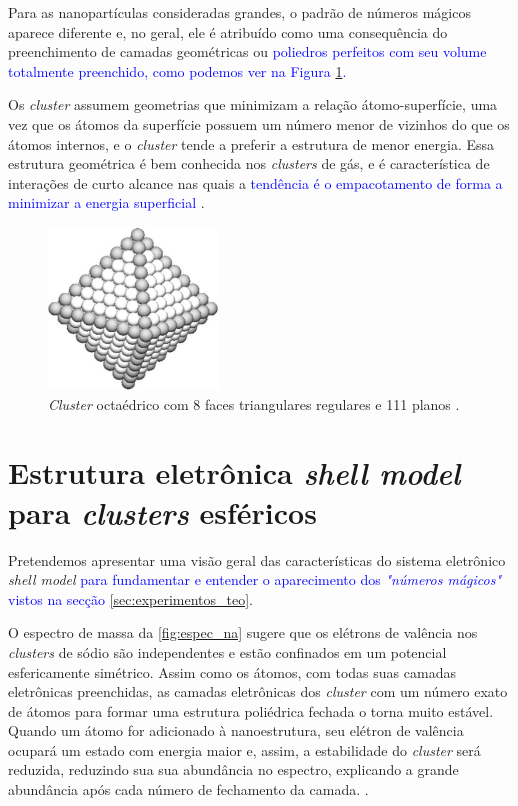 Para as nanopartículas consideradas grandes, o padrão de números mágicos aparece diferente e, no geral, ele é atribuído como uma consequência do preenchimento de camadas geométricas ou \textcolor{blue}{poliedros perfeitos com seu volume totalmente preenchido, como podemos ver na Figura \ref{fig:octaedro}.}

Os \textit{cluster} assumem geometrias que minimizam a relação átomo-superfície, uma vez que os átomos da superfície possuem um número menor de vizinhos do que os átomos internos, e o \textit{cluster} tende a preferir a estrutura de menor energia. Essa estrutura geométrica é bem conhecida nos \textit{clusters} de gás, e é característica de interações de curto alcance nas quais a \textcolor{blue}{tendência é o empacotamento de forma a minimizar a energia superficial \cite{capitulo_livro_shell}}.

\begin{figure}
  \centering
  \includegraphics[width=0.4\textwidth]{images/clusters/octaedro.jpg}
  \caption{\textit{Cluster} octaédrico com 8 faces triangulares regulares e 111 planos  \cite{KATAKUSE1985229}.  }
  \label{fig:octaedro}
\end{figure}


\section{Estrutura eletrônica \textit{shell model} para \textit{clusters} esféricos} \label{section_shell_model}

 Pretendemos apresentar uma visão geral das características do sistema eletrônico \textit{shell model} \textcolor{blue}{para fundamentar e entender o aparecimento dos \textit{"números mágicos"} vistos na secção \ref{sec:experimentos_teo}}.

O espectro de massa da \ref{fig:espec_na} sugere que os elétrons de valência nos \textit{clusters} de sódio são independentes e estão confinados em um potencial esfericamente simétrico. Assim como os átomos, com todas suas camadas eletrônicas preenchidas, as camadas eletrônicas dos \textit{cluster} com um número exato de átomos para formar uma estrutura poliédrica fechada o torna muito estável. Quando um átomo for adicionado à nanoestrutura, seu elétron de valência ocupará um estado com energia maior e, assim, a estabilidade do \textit{cluster} será reduzida, reduzindo sua sua abundância no espectro, explicando a grande abundância após cada número de fechamento da camada. \cite{capitulo_livro_shell}.

